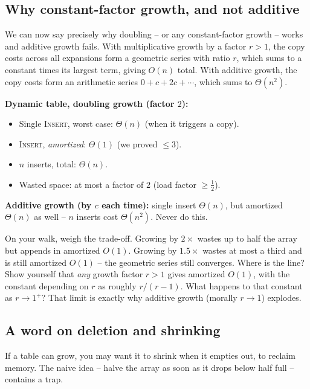 \subsection{Why constant-factor growth, and not additive}

We can now say precisely why doubling -- or any constant-factor growth -- works and
additive growth fails. With multiplicative growth by a factor $r > 1$, the copy
costs across all expansions form a geometric series with ratio $r$, which sums to a
constant times its largest term, giving $O(n)$ total. With additive growth, the
copy costs form an arithmetic series $0 + c + 2c + \cdots$, which sums to
$\Theta(n^2)$.

\begin{complexitybox}
\textbf{Dynamic table, doubling growth (factor $2$):}
\begin{itemize}
  \item Single \textsc{Insert}, worst case: $\Theta(n)$ (when it triggers a copy).
  \item \textsc{Insert}, \emph{amortized}: $\Theta(1)$ (we proved $\le 3$).
  \item $n$ inserts, total: $\Theta(n)$.
  \item Wasted space: at most a factor of $2$ (load factor $\ge \tfrac12$).
\end{itemize}
\textbf{Additive growth (by $c$ each time):} single insert $\Theta(n)$, but
amortized $\Theta(n)$ as well -- $n$ inserts cost $\Theta(n^2)$. Never do this.
\end{complexitybox}

\begin{walkbox}
On your walk, weigh the trade-off. Growing by $2\times$ wastes up to half the
array but appends in amortized $O(1)$. Growing by $1.5\times$ wastes at most a
third and is still amortized $O(1)$ -- the geometric series still converges. Where
is the line? Show yourself that \emph{any} growth factor $r > 1$ gives amortized
$O(1)$, with the constant depending on $r$ as roughly $r/(r-1)$. What happens to
that constant as $r \to 1^{+}$? That limit is exactly why additive growth (morally
$r \to 1$) explodes.
\end{walkbox}

\subsection{A word on deletion and shrinking}

If a table can grow, you may want it to shrink when it empties out, to reclaim
memory. The naive idea -- halve the array as soon as it drops below half full --
contains a trap.

